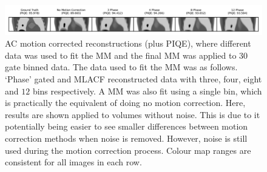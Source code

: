             \begin{figure}
                \centering
                
                \includegraphics[width=1.0\linewidth]{figures/motion_correction_2_results_2_noiseless_phase_visual_analysis.png}
                
                \captionsetup{singlelinecheck=false}
                \caption{
                    \gls{AC} motion corrected reconstructions (plus \gls{PIQE}), where different data was used to fit the \gls{MM} and the final \gls{MM} was applied to $30$ gate binned data. The data used to fit the \gls{MM} was as follows. `Phase' gated and \gls{MLACF} reconstructed data with three, four, eight and $12$ bins respectively. A \gls{MM} was also fit using a single bin, which is practically the equivalent of doing no motion correction. Here, results are shown applied to volumes without noise. This is due to it potentially being easier to see smaller differences between motion correction methods when noise is removed. However, noise is still used during the motion correction process. Colour map ranges are consistent for all images in each row.
                }
                
                \label{fig:evaluation_of_pet_ct_motion_correction_incorporating_motion_models_using_mlacf_and_complex_gating_schemes_results_noiseless_phase_visual_analysis}
            \end{figure}

